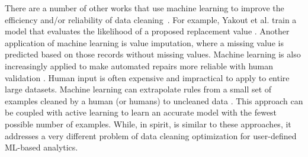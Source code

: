 There are a number of other works that use machine learning to improve the efficiency and/or reliability of data cleaning~\cite{DBLP:journals/pvldb/YakoutENOI11,yakout2013don,gokhale2014corleone}.
For example, Yakout et al. train a model that evaluates the likelihood of a proposed replacement value \cite{yakout2013don}.
Another application of machine learning is value imputation, where a missing value is predicted based on those records without missing values.
Machine learning is also increasingly applied to make automated repairs more reliable with human validation \cite{DBLP:journals/pvldb/YakoutENOI11}.
Human input is often expensive and impractical to apply to entire large datasets.
Machine learning can extrapolate rules from a small set of examples cleaned by a human (or humans) to uncleaned data \cite{gokhale2014corleone, DBLP:journals/pvldb/YakoutENOI11}.
This approach can be coupled with active learning \cite{DBLP:journals/pvldb/MozafariSFJM14} to learn an accurate model with the fewest possible number of examples.
While, in spirit, \sys is similar to these approaches, it addresses a very different problem of data cleaning optimization for user-defined ML-based analytics.


